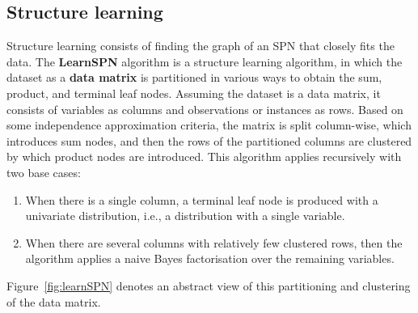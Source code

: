 \documentclass{article}
\begin{document}
\subsection{Structure learning}

Structure learning consists of finding the graph of an SPN that closely fits the data. The \textbf{LearnSPN} algorithm is a structure learning algorithm, in which the dataset as a \textbf{data matrix} is partitioned in various ways to obtain the sum, product, and terminal leaf nodes. Assuming the dataset is a data matrix, it consists of variables as columns and observations or instances as rows. Based on some independence approximation criteria, the matrix is split column-wise, which introduces sum nodes, and then the rows of the partitioned columns are clustered by which product nodes are introduced. This algorithm applies recursively with two base cases:
\begin{enumerate}
    \item When there is a single column, a terminal leaf node is produced with a univariate distribution, i.e., a distribution with a single variable.
    \item When there are several columns with relatively few clustered rows, then the algorithm applies a naive Bayes factorisation over the remaining variables. 
\end{enumerate}

\noindent Figure~\ref{fig:learnSPN} denotes an abstract view of this partitioning and clustering of the data matrix. 
\end{document}
